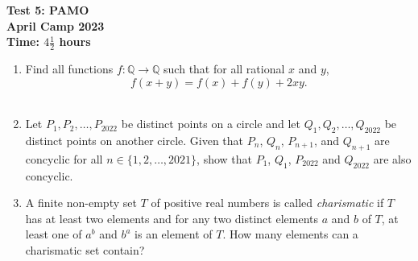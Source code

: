 \documentclass{article}
\begin{document}
\thispagestyle{empty}

\begin{center}
  \textbf{\Large Test 5: PAMO}
  \\ \vspace{1em}
  \textbf{\large April Camp 2023}
  \\ \vspace{1em}
  \textbf{\large Time: $4\frac{1}{2}$ hours}
\end{center}

\bigskip
\vfill

\begin{enumerate}[itemsep=\fill]

\item %
Find all functions $f : \mathbb{Q} \to \mathbb{Q}$ such that for all rational $x$ and $y$,
\[ f(x+y) = f(x) +f(y) +2xy. \]~\vspace{-24pt}


\item %
Let $P_1, P_2, \dotsc, P_{2022}$ be distinct points on a circle and let $Q_1, Q_2, \dotsc, Q_{2022}$ be distinct points on another circle.
Given that $P_n$, $Q_n$, $P_{n+1}$, and $Q_{n+1}$ are concyclic for all $n \in \{1, 2, \dotsc, 2021\}$, show that $P_1$, $Q_1$, $P_{2022}$ and $Q_{2022}$ are also concyclic.


\item %
A finite non-empty set $T$ of positive real numbers is called \emph{charismatic} if $T$ has at least two elements and for any two distinct elements $a$ and $b$ of $T$, at least one of $a^b$ and $b^a$ is an element of $T$.
How many elements can a charismatic set contain?


\end{enumerate}
\end{document}
